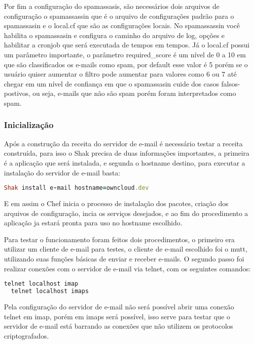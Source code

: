 Por fim a configuração do spamassasis, são necessários dois arquivos de configuração
o spamassassin que é o arquivo de configurações padrão para o spamassasin e o
local.cf que são as configurações locais. No spamassassin você habilita o spamassasin
e configura o caminho do arquivo de log, opções e habilitar a cronjob que será
executada de tempos em tempos. Já o local.cf possui um parâmetro importante, o
parâmetro required\_score é um nível de 0 a 10 em que são classificados os e-mails
como spam, por default esse valor é 5 porém se o usuário quiser aumentar o filtro
pode aumentar para valores como 6 ou 7 até chegar em um nível de confiança em que
o spamassasin cuide dos casos falsos-postivos, ou seja, e-mails que não são spam
porém foram interpretados como spam.

\subsubsection{Inicialização}

Após a construção da receita do servidor de e-mail é necessário testar a receita construída,
para isso o Shak precisa de duas informações importantes, a primeira é a aplicação
que será instalada, e segunda o hostname destino, para executar a instalação
do servidor de e-mail basta:

\begin{lstlisting}[language=Ruby,label=dice_index,caption={Exemplo de execução de instalação do servidor de e-mailcom shak}]
Shak install e-mail hostname=owncloud.dev
\end{lstlisting}


E em assim o Chef inicia o processo de instalação dos pacotes, criação dos arquivos
de configuração, incia os serviços desejados, e ao fim do procedimento a aplicação
ja estará pronta para uso no hostname escolhido.

Para testar o funcionamento foram feitos dois procedimentos, o primeiro era utilizar
um cliente de e-mail para testes, o cliente de e-mail escolhido foi o mutt, utilizando
suas funções básicas de enviar e receber e-mails. O segundo passo foi realizar conexões
com o servidor de e-mail via telnet, com os seguintes comandos:

\begin{lstlisting}[language=Ruby,label=dice_index,caption={Exemplo de teste de conexão telnet no servidor imap}]
  telnet localhost imap
  telnet localhost imaps
\end{lstlisting}

Pela configuração do servidor de e-mail não será possível abrir uma conexão telnet
em imap, porém em imaps será possível, isso serve para testar que o servidor de e-mail
está barrando as conexões que não utilizem os protocolos criptografados.


